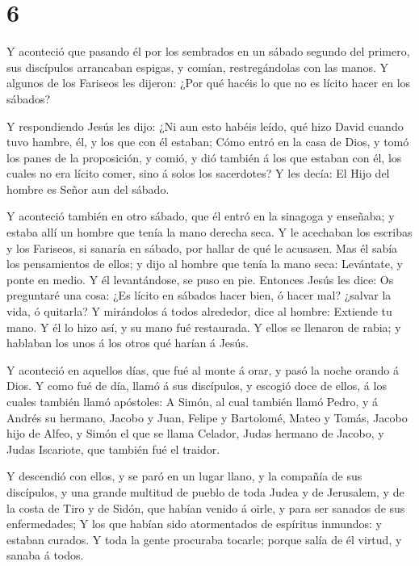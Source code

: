 \hypertarget{section-5}{%
\section{6}\label{section-5}}

 Y aconteció que pasando él por los sembrados en un sábado
segundo del primero, sus discípulos arrancaban espigas, y comían,
restregándolas con las manos.  Y algunos de los Fariseos les
dijeron: ¿Por qué hacéis lo que no es lícito hacer en los sábados?

 Y respondiendo Jesús les dijo: ¿Ni aun esto habéis leído,
qué hizo David cuando tuvo hambre, él, y los que con él estaban;
 Cómo entró en la casa de Dios, y tomó los panes de la
proposición, y comió, y dió también á los que estaban con él, los cuales
no era lícito comer, sino á solos los sacerdotes?  Y les
decía: El Hijo del hombre es Señor aun del sábado.

 Y aconteció también en otro sábado, que él entró en la
sinagoga y enseñaba; y estaba allí un hombre que tenía la mano derecha
seca.  Y le acechaban los escribas y los Fariseos, si
sanaría en sábado, por hallar de qué le acusasen.  Mas él
sabía los pensamientos de ellos; y dijo al hombre que tenía la mano
seca: Levántate, y ponte en medio. Y él levantándose, se puso en pie.
 Entonces Jesús les dice: Os preguntaré una cosa: ¿Es lícito
en sábados hacer bien, ó hacer mal? ¿salvar la vida, ó quitarla?
 Y mirándolos á todos alrededor, dice al hombre: Extiende
tu mano. Y él lo hizo así, y su mano fué restaurada.  Y
ellos se llenaron de rabia; y hablaban los unos á los otros qué harían á
Jesús.

 Y aconteció en aquellos días, que fué al monte á orar, y
pasó la noche orando á Dios.  Y como fué de día, llamó á
sus discípulos, y escogió doce de ellos, á los cuales también llamó
apóstoles:  A Simón, al cual también llamó Pedro, y á
Andrés su hermano, Jacobo y Juan, Felipe y Bartolomé, 
Mateo y Tomás, Jacobo hijo de Alfeo, y Simón el que se llama Celador,
 Judas hermano de Jacobo, y Judas Iscariote, que también
fué el traidor.

 Y descendió con ellos, y se paró en un lugar llano, y la
compañía de sus discípulos, y una grande multitud de pueblo de toda
Judea y de Jerusalem, y de la costa de Tiro y de Sidón, que habían
venido á oirle, y para ser sanados de sus enfermedades;  Y
los que habían sido atormentados de espíritus inmundos: y estaban
curados.  Y toda la gente procuraba tocarle; porque salía
de él virtud, y sanaba á todos.

